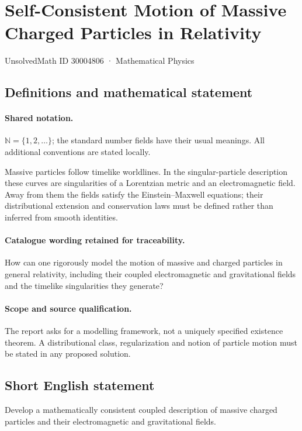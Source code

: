 \documentclass[11pt]{article}
\begin{document}
\setcounter{section}{30004805}
\section{Self-Consistent Motion of Massive Charged Particles in Relativity}\label{30004806}
{\small UnsolvedMath ID 30004806 · Mathematical Physics}
\subsection{Definitions and mathematical statement}

\paragraph{Shared notation.}$\mathbb N=\{1,2,\ldots\}$; the standard number fields have their usual meanings. All additional conventions are stated locally.


Massive particles follow timelike worldlines. In the singular-particle description these curves are singularities of a Lorentzian metric and an electromagnetic field. Away from them the fields satisfy the Einstein--Maxwell equations; their distributional extension and conservation laws must be defined rather than inferred from smooth identities.

\paragraph{Catalogue wording retained for traceability.}
How can one rigorously model the motion of massive and charged particles in general relativity, including their coupled electromagnetic and gravitational fields and the timelike singularities they generate?

\paragraph{Scope and source qualification.}The report asks for a modelling framework, not a uniquely specified existence theorem. A distributional class, regularization and notion of particle motion must be stated in any proposed solution.
\subsection{Short English statement}
Develop a mathematically consistent coupled description of massive charged particles and their electromagnetic and gravitational fields.
\end{document}

